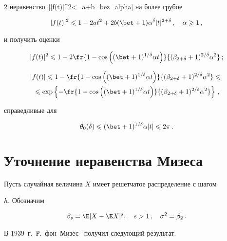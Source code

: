 \begin{multicols}{2}
неравенство~\eqref{|f(t)|^2<=a+b_bez_alpha} на более грубое

$$

|f(t)|^2\le 1-2at^2+2b(\bet+1)\alpha^\d|t|^{2+\delta}\,,\quad

\alpha\ge1\,,

$$

и получить оценки

$$

|f(t)|^2\le1- 2\fr{1-\cos\left((\bet+1)^{1/\d}\alpha

t\right)} {(\beta_{2+\d}+1)^{2/\d}\alpha^2}\,;

$$

\vspace*{-12pt}



\noindent

\begin{multline*}

|f(t)|\le 1-\fr{1-\cos\left((\bet+1)^{1/\d}\alpha t\right)}

{(\beta_{2+\d}+1)^{2/\d}\alpha^2}\le{}\\

{}\le

\exp\left\{-\fr{1-\cos\left((\bet+1)^{1/\d}\alpha t\right)}

{(\beta_{2+\d}+1)^{2/\d}\alpha^2}\right\}\,,

\end{multline*}

справедливые для

$$

\theta_0(\d)\le (\bet+1)^{1/\d}\alpha|t|  \le2\pi\,.

$$






\section{Уточнение неравенства Мизеса}



Пусть случайная величина $X$ имеет решетчатое распределение с шагом

$h$. Обозначим

$$

\beta_s=\E|X-\E X|^s,\quad s>1\,,\quad \sigma^2=\beta_2\,.

$$

В 1939~г.\ Р.~фон~Мизес~\cite{Mises1939} получил следующий результат.




\end{multicols}
